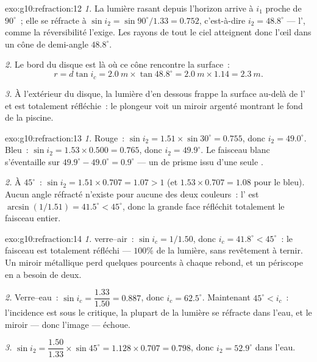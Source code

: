 \begin{solution}{exo:g10:refraction:12}
\emph{1.} La lumière rasant depuis l'horizon arrive à $i_1$ proche de
$90^\circ$~; elle se réfracte à $\sin i_2 = \sin 90^\circ / 1.33 = 0.752$,
c'est-à-dire $i_2 = 48.8^\circ$ --- l', comme la
réversibilité l'exige. Les rayons de tout le ciel atteignent donc l'œil
dans un cône de demi-angle $48.8^\circ$.

\emph{2.} Le bord du disque est là où ce cône rencontre la surface~:
\[
r = d \tan i_c = \qty{2.0}{m} \times \tan 48.8^\circ
= \qty{2.0}{m} \times 1.14 = \qty{2.3}{m}.
\]

\emph{3.} À l'extérieur du disque, la lumière d'en dessous frappe la
surface au-delà de l' et est totalement réfléchie~: le
plongeur voit un miroir argenté montrant le fond de la piscine.
\end{solution}

\begin{solution}{exo:g10:refraction:13}
\emph{1.} Rouge~: $\sin i_2 = 1.51 \times \sin 30^\circ = 0.755$, donc
$i_2 = 49.0^\circ$. Bleu~: $\sin i_2 = 1.53 \times 0.500 = 0.765$,
donc $i_2 = 49.9^\circ$. Le faisceau blanc s'éventaille sur
$49.9^\circ - 49.0^\circ = 0.9^\circ$ --- un  de prisme
issu d'une seule .

\emph{2.} À $45^\circ$~: $\sin i_2 = 1.51 \times 0.707 = 1.07 > 1$
(et $1.53 \times 0.707 = 1.08$ pour le bleu). Aucun angle réfracté
n'existe pour aucune des deux couleurs~: l' est
$\arcsin(1/1.51) = 41.5^\circ < 45^\circ$, donc la grande face réfléchit
totalement le faisceau entier.
\end{solution}

\begin{solution}{exo:g10:refraction:14}
\emph{1.}  verre--air~: $\sin i_c = 1/1.50$, donc
$i_c = 41.8^\circ < 45^\circ$~: le faisceau est totalement réfléchi ---
$100\%$ de la lumière, sans revêtement à ternir. Un miroir métallique
perd quelques pourcents à chaque rebond, et un périscope en a besoin
de deux.

\emph{2.} Verre--eau~: $\sin i_c = \dfrac{1.33}{1.50} = 0.887$, donc
$i_c = 62.5^\circ$. Maintenant $45^\circ < i_c$~: l'incidence est sous
le critique, la plupart de la lumière se réfracte dans l'eau, et le
miroir --- donc l'image --- échoue.

\emph{3.} $\sin i_2 = \dfrac{1.50}{1.33} \times \sin 45^\circ
= 1.128 \times 0.707 = 0.798$, donc $i_2 = 52.9^\circ$ dans l'eau.
\end{solution}

